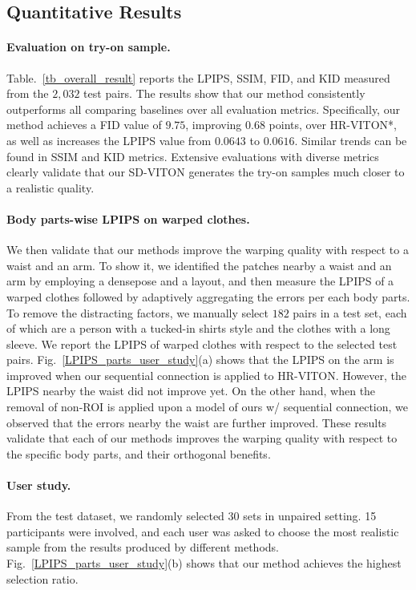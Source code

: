 \documentclass[letterpaper]{article} %
\begin{document}
\subsection{Quantitative Results}

\paragraph{Evaluation on try-on sample.} Table.~\ref{tb_overall_result} reports the LPIPS, SSIM, FID, and KID measured from the $2,032$ test pairs.
The results show that our method consistently outperforms all comparing baselines over all evaluation metrics.
Specifically, our method achieves a FID value of $9.75$, improving $0.68$ points, over HR-VITON*, as well as increases the LPIPS value from $0.0643$ to $0.0616$.
Similar trends can be found in SSIM and KID metrics.
Extensive evaluations with diverse metrics clearly validate that our SD-VITON generates the try-on samples much closer to a realistic quality.

\paragraph{Body parts-wise LPIPS on warped clothes.} We then validate that our methods improve the warping quality with respect to a waist and an arm.
To show it, we identified the patches nearby a waist and an arm by employing a densepose and a layout, and then measure the LPIPS of a warped clothes followed by adaptively aggregating the errors per each body parts.
To remove the distracting factors, we manually select $182$ pairs in a test set, each of which are a person with a tucked-in shirts style and the clothes with a long sleeve.
We report the LPIPS of warped clothes with respect to the selected test pairs.
Fig.~\ref{LPIPS_parts_user_study}(a) shows that the LPIPS on the arm is improved when our sequential connection is applied to HR-VITON.
However, the LPIPS nearby the waist did not improve yet.
On the other hand, when the removal of non-ROI is applied upon a model of ours w/ sequential connection, we observed that the errors nearby the waist are further improved.
These results validate that each of our methods improves the warping quality with respect to the specific body parts, and their orthogonal benefits.

\paragraph{User study.}
From the test dataset, we randomly selected 30 sets in unpaired setting. 15 participants were involved, and each user was asked to choose the most realistic sample from the results produced by different methods. Fig.~\ref{LPIPS_parts_user_study}(b) shows that our method achieves the highest selection ratio.
\end{document}
